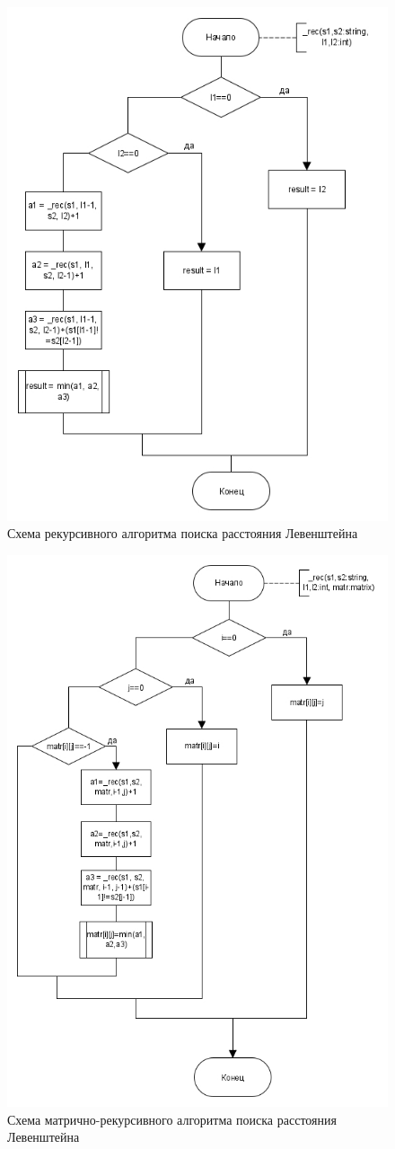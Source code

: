 \begin{figure}[H]
	\centering
	\includegraphics[width=0.7\linewidth]{src/Levenstein_r}
	\caption{Схема рекурсивного алгоритма поиска расстояния Левенштейна}
	\label{fig:levensteinr}
\end{figure}
\begin{figure}
	\centering
	\includegraphics[width=0.8\linewidth]{src/Levenstein_rm}
	\caption{Схема матрично-рекурсивного алгоритма поиска расстояния Левенштейна}
	\label{fig:levensteinrm}
\end{figure}
